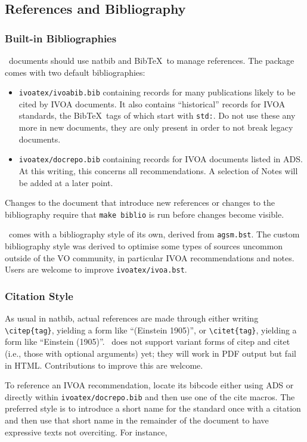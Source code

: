 \documentclass[11pt,a4paper]{ivoa}
\newcommand{\BibTeX}{BibTeX}
\begin{document}
\subsection{References and Bibliography}

\subsubsection{Built-in Bibliographies}
\ivoatex\ documents should use natbib and \BibTeX\ to manage references.
The package comes with two default bibliographies:

\begin{itemize}
\item \texttt{ivoatex/ivoabib.bib} containing records for many publications
likely to be cited by IVOA documents.  It also contains ``historical''
records for IVOA standards, the \BibTeX\ tags of which start with
\texttt{std:}.  Do not use these any more in new documents, they are
only present in order to not break legacy documents.
\item\texttt{ivoatex/docrepo.bib} containing records for IVOA documents
listed in ADS.  At this writing, this concerns all recommendations.  A
selection of Notes will be added at a later point.
\end{itemize}

Changes to the document that introduce new references or changes to the
bibliography require that \texttt{make biblio} is run before changes
become visible.

\ivoatex\ comes with a bibliography style of its own, derived from
\texttt{agsm.bst}.  The custom bibliography style was derived to
optimise some types of sources uncommon outside of the VO community, in
particular IVOA recommendations and notes.  Users are welcome to improve
\texttt{ivoatex/ivoa.bst}.

\subsubsection{Citation Style}

As usual in natbib, actual references are made through either writing
\verb|\citep{tag}|, yielding a form like ``(Einstein 1905)'',
or \verb|\citet{tag}|, yielding a form like ``Einstein (1905)''.
\ivoatex\ does not support variant forms of citep and citet (i.e., those
with optional arguments) yet; they will work in PDF output but fail in
HTML.  Contributions to improve this are welcome.

To reference an IVOA recommendation, locate its bibcode either using ADS
or directly within \texttt{ivoatex/docrepo.bib} and then use one of the
cite macros.  The preferred style is to introduce a short name for the
standard once with a citation and then use that short name in the
remainder of the document to have expressive texts not overciting. For
instance,
\end{document}
